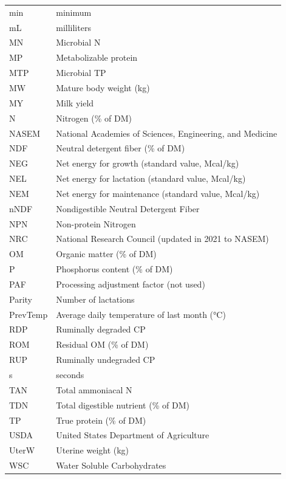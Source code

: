 \documentclass{article}
\begin{document}
\begin{longtable}{@{} L{0.23\textwidth} L{0.70\textwidth} @{}}
min & minimum \\
mL & milliliters \\
MN & Microbial N \\
MP & Metabolizable protein \\
MTP & Microbial TP \\
MW & Mature body weight (kg) \\
MY & Milk yield \\
N & Nitrogen (\% of DM) \\
NASEM & National Academies of Sciences, Engineering, and Medicine \\
NDF & Neutral detergent fiber (\% of DM) \\
NEG & Net energy for growth (standard value, Mcal/kg) \\
NEL & Net energy for lactation (standard value, Mcal/kg) \\
NEM & Net energy for maintenance (standard value, Mcal/kg) \\
nNDF & Nondigestible Neutral Detergent Fiber \\
NPN & Non-protein Nitrogen \\
NRC & National Research Council (updated in 2021 to NASEM) \\
OM & Organic matter (\% of DM) \\
P & Phosphorus content (\% of DM) \\
PAF & Processing adjustment factor (not used) \\
Parity & Number of lactations \\
PrevTemp & Average daily temperature of last month (°C) \\
RDP & Ruminally degraded CP \\
ROM & Residual OM (\% of DM) \\
RUP & Ruminally undegraded CP \\
s & seconds \\
TAN & Total ammoniacal N \\
TDN & Total digestible nutrient (\% of DM) \\
TP & True protein (\% of DM) \\
USDA & United States Department of Agriculture \\
UterW & Uterine weight (kg) \\
WSC & Water Soluble Carbohydrates \\
\end{longtable}
\end{document}
